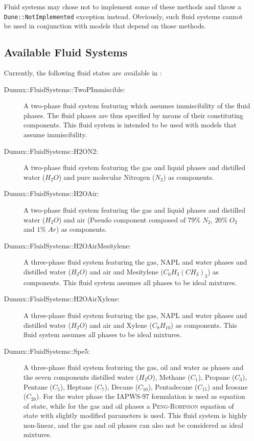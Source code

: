 Fluid systems may chose not to implement some of these methods and
throw a \texttt{Dune::NotImplemented} exception instead. Obviously,
such fluid systems cannot be used in conjunction with models that
depend on those methods.

\subsection{Available Fluid Systems}
Currently, the following fluid states are available in \Dumux:
\begin{description}
\item[Dumux::FluidSystems::TwoPImmiscible:] A two-phase fluid
  system featuring which assumes immiscibility of the fluid
  phases. The fluid phases are thus specified by means of their
  constituting components. This fluid system is intended to be used
  with models that assume immiscibility.
\item[Dumux::FluidSystems::H2ON2:] A two-phase fluid system
  featuring the gas and liquid phases and distilled water ($H_2O$) and
  pure molecular Nitrogen ($N_2$) as components.
\item[Dumux::FluidSystems::H2OAir:] A two-phase fluid system
  featuring the gas and liquid phases and distilled water ($H_2O$) and
  air (Pseudo component composed of $79\%\;N_2$, $20\%\;O_2$ and
  $1\%\;Ar$) as components.
\item[Dumux::FluidSystems::H2OAirMesitylene:] A three-phase fluid
  system featuring the gas, NAPL and water phases and distilled water
  ($H_2O$) and air and Mesitylene ($C_6H_3(CH_3)_3$) as components. This fluid
  system assumes all phases to be ideal mixtures.
\item[Dumux::FluidSystems::H2OAirXylene:] A three-phase fluid
  system featuring the gas, NAPL and water phases and distilled water
  ($H_2O$) and air and Xylene ($C_8H_{10}$) as components. This fluid
  system assumes all phases to be ideal mixtures.
\item[Dumux::FluidSystems::Spe5:] A three-phase fluid system
  featuring the gas, oil and water as phases and the seven components
  distilled water ($H_2O$), Methane ($C_1$), Propane ($C_3$), Pentane
  ($C_5$), Heptane ($C_7$), Decane ($C_{10}$), Pentadecane
  ($C_{15}$) and Icosane ($C_{20}$). For the water phase the IAPWS-97
  formulation is used as equation of state, while for the gas and oil
  phases a \textsc{Peng}-\textsc{Robinson} equation of state with
  slightly modified parameters is used. This fluid system is highly
  non-linear, and the gas and oil phases can also not be considered as
  ideal mixtures\cite{SPE5}.
\end{description}

